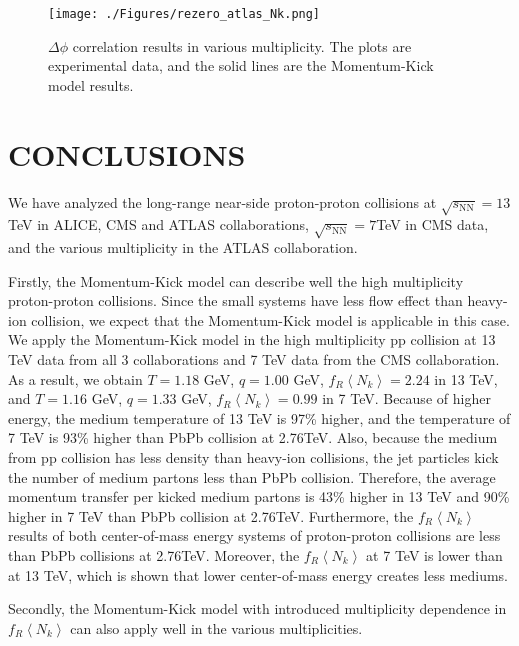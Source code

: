 \documentclass[jkps,fleqn,showpacs,showkeys]{revtex4}
\begin{document}
\begin{figure}[ht]
\centering
\texttt{[image: ./Figures/rezero\_atlas\_Nk.png]}
\caption{$\Delta \phi$ correlation results in various multiplicity.
The plots are experimental data, and the solid lines are the Momentum-Kick model results.
}
\label{figure:variousmulti}
\end{figure}



\section*{CONCLUSIONS}
\label{sec:Conclusion}


We have analyzed the long-range near-side proton-proton collisions at $\sqrt{s_\text{NN}}=13$TeV in ALICE, CMS and ATLAS collaborations\cite{alice, cms, atlas}, $\sqrt{s_\text{NN}}=7$TeV in CMS data\cite{cms}, and the various multiplicity in the ATLAS collaboration\cite{atlas}.

Firstly, the Momentum-Kick model can describe well the high multiplicity proton-proton collisions.
Since the small systems have less flow effect than heavy-ion collision, we expect that the Momentum-Kick model is applicable in this case.
We apply the Momentum-Kick model in the high multiplicity pp collision at 13 TeV data from all 3 collaborations and 7 TeV data from the CMS collaboration. 
As a result, we obtain $T=1.18$ GeV, $q=1.00$ GeV, $f_R\left\langle N_k\right\rangle = 2.24$ in 13 TeV, and $T=1.16$ GeV, $q=1.33$ GeV, $f_R\left\langle N_k\right\rangle = 0.99$ in 7 TeV.
Because of higher energy, the medium temperature of 13 TeV is 97\% higher, and the temperature of 7 TeV is 93\% higher than PbPb collision at 2.76TeV.
Also, because the medium from pp collision has less density than heavy-ion collisions, the jet particles kick the number of medium partons less than PbPb collision.
Therefore, the average momentum transfer per kicked medium partons is 43\% higher in 13 TeV and 90\% higher in 7 TeV than PbPb collision at 2.76TeV.
Furthermore, the $f_R\left\langle N_k\right\rangle$ results of both center-of-mass energy systems of proton-proton collisions are less than PbPb collisions at 2.76TeV.
Moreover, the $f_R\left\langle N_k\right\rangle$ at 7 TeV is lower than at 13 TeV, which is shown that lower center-of-mass energy creates less mediums.


Secondly, the Momentum-Kick model with introduced multiplicity dependence in $f_R\left\langle N_k\right\rangle$ can also apply well in the various multiplicities.
\end{document}
